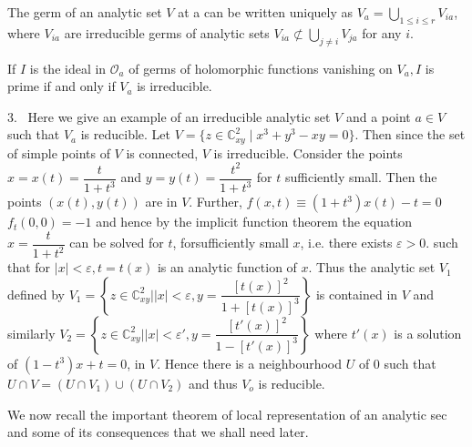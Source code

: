 \setcounter{proposition}{0}
\begin{proposition}\label{chap1-prop1}  %
  The germ of an analytic set $V$ at a can be written uni\-quely as 
$V_{a} = \bigcup\limits_{1 \leq i \leq r} V_{ia}$, where $V_{ia}$ are
  irreducible germs of analytic sets $V_{ia}\not\subset
  \bigcup\limits_{j \neq i} V_{ja}$ for any $i$. 
\end{proposition}

\setcounter{remarks}{1}
\begin{remarks}\label{chap1-rems2} 
  If $I$ is the ideal in $\mathscr{O}_{a}$ of germs of holomorphic
  functions vanishing on $V_{a}, I$ is prime if and only if $V_{a}$ is
  irreducible.  
\end{remarks}

3.~ Here we give an example of an irreducible analytic set $V$ and a
point $a \in V$ such that $V_{a}$ is reducible. Let $V = \{ z \in
\mathbb{C}^{2}_{xy} \mid x^{3} + y^{3} - xy = 0 \}$. Then since the
set of simple points of $V$ is connected, $V$ is irreducible. Consider
the points $x = x(t) = \dfrac{t}{1+t^{3}}$ and $y = y(t) =
\dfrac{t^{2}}{1+t^{3}}$ for $t$ sufficiently small. Then the points
$(x(t), y(t))$ are in $V$. Further, $f(x,t) \equiv  (1+ t^{3}) x(t) - t =
0$  $f_{t}(0,0) = -1$ and hence  by the implicit
function theorem the equation $x =   \dfrac{t}{1+t^{2}}$ can be solved
for $t$, for\pageoriginale sufficiently small $x$, i.e. there exists
$\varepsilon > 0$. such that for $|x|< \varepsilon, t = t(x)$ is an analytic function
of $x$. Thus the analytic set $V_{1}$ defined by $V_{1} = \left\{ z \in
\mathbb{C}^{2}_{xy}\big| |x| < \varepsilon ,y =
\dfrac{[t(x)]^{2}}{1+[t(x)]^{3}}\right\}$ is contained in $V$ and
similarly $V_{2} = \left\{ z \in \mathbb{C}^{2}_{xy}\big| |x| <
\varepsilon' ,y =  \dfrac{[t'(x)]^{2}}{1-[t'(x)]^{3}}\right\}$ where
$t'(x)$ is a solution of $(1-t^{3})x+t=0$, in $V$. Hence there is a
neighbourhood $U$ of $0$ such that $U \cap V = (U \cap V_{1}) \cup (U
\cap V_{2})$ and thus $V_{o}$ is reducible. 

We now recall the important theorem of local representation of an
analytic sec and some of its consequences that we shall need later. 

